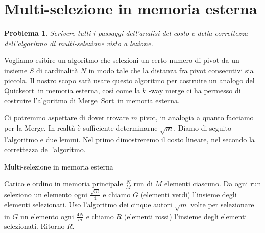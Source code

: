 \documentclass[a4paper, 11pt]{article}
\theoremstyle{plain}
\newtheorem*{problem*}{Problema}
\newcommand{\quicksort}{\mbox{\sc Quicksort }}
\newcommand{\mergesort}{\mbox{\sc Merge Sort }}
\begin{document}
    \section*{Multi-selezione in memoria esterna}    

    \begin{problem*}
        Scrivere tutti i passaggi dell'analisi del costo e della correttezza
        dell'algoritmo di multi-selezione visto a lezione.
    \end{problem*}

    Vogliamo esibire un algoritmo che selezioni un certo numero di pivot da un
    insieme \(S\) di cardinalit\`a \(N\) in modo tale che la distanza fra pivot
    consecutivi sia piccola. Il nostro scopo sar\`a usare questo algoritmo per
    costruire un analogo del \quicksort in memoria esterna, cos\`i come la \(k\)
    -way merge ci ha permesso di costruire l'algoritmo di \mergesort in 
    memoria esterna.

    Ci potremmo aspettare di dover trovare \(m\) pivot, in analogia a quanto
    facciamo per la Merge. In realt\`a \`e sufficiente determinarne \(\sqrt{m}\).
    Diamo di seguito l'algoritmo e due lemmi. Nel primo dimostreremo il costo
    lineare, nel secondo la correttezza dell'algoritmo.

    \begin{algorithm}
        \caption{Multi-selezione in memoria esterna}
        \begin{algorithmic}[1]
            \STATE Carico e ordino in memoria principale \(\frac{N}{M}\) run
            di \(M\) elementi ciascuno.
            \STATE Da ogni run seleziono un elemento ogni 
            \(\frac{\sqrt{m}}{4}\) e chiamo \(G\) (elementi verdi) l'insieme 
            degli elementi selezionati.
            \STATE Uso l'algoritmo dei cinque autori \(\sqrt{m}\) volte per
            selezionare in \(G\) un elemento ogni \(\frac{4N}{m}\) e chiamo 
            \(R\) (elementi rossi) l'insieme degli elementi selezionati.
            \STATE Ritorno \(R\).
        \end{algorithmic}
    \end{algorithm}
\end{document}
